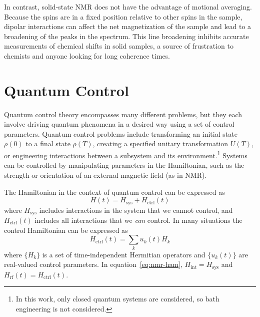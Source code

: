 In contrast, solid-state NMR does not have the advantage of motional averaging. Because the spins are in a fixed position relative to other spins in the sample, dipolar interactions can affect the net magnetization of the sample and lead to a broadening of the peaks in the spectrum. This line broadening inhibits accurate measurements of chemical shifts in solid samples, a source of frustration to chemists and anyone looking for long coherence times.



\section{Quantum Control}

Quantum control theory encompasses many different problems, but they each involve driving quantum phenomena in a desired way using a set of control parameters. Quantum control problems include transforming an initial state $\rho(0)$ to a final state $\rho(T)$, creating a specified unitary transformation $U(T)$, or engineering interactions between a subsystem and its environment.\cite{Dong_2010}\footnote{In this work, only closed quantum systems are considered, so bath engineering is not considered.} Systems can be controlled by manipulating parameters in the Hamiltonian, such as the strength or orientation of an external magnetic field (as in NMR).

The Hamiltonian in the context of quantum control can be expressed as
\begin{equation}
    H(t) = H_{\text{sys}} + H_{\text{ctrl}}(t)
\end{equation}
where $H_{\text{sys}}$ includes interactions in the system that we cannot control, and $H_{\text{ctrl}}(t)$ includes all interactions that we \emph{can} control. In many situations the control Hamiltonian can be expressed as
\[
H_{\text{ctrl}}(t) = \sum_k u_k(t) H_k
\]
where $\{H_k\}$ is a set of time-independent Hermitian operators and $\{u_k(t)\}$ are real-valued control parameters. In equation~\ref{eq:nmr-ham}, $H_{\text{int}} = H_{\text{sys}}$  and $H_{\text{rf}}(t) = H_{\text{ctrl}}(t)$.


